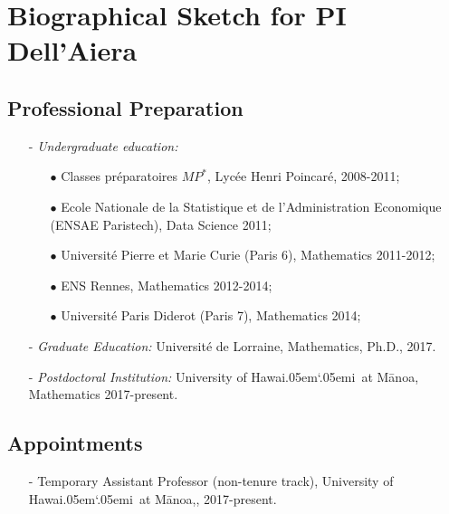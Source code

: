\documentclass[11pt]{article}
\newcommand{\Manoa}{M\=anoa}
\newcommand{\Hawaii}{Hawai\kern.05em`\kern.05em\relax i}
\begin{document}

\section*{Biographical Sketch for PI Dell'Aiera}

\subsection*{Professional Preparation}

\begin{itemize}

\item[-] \emph{Undergraduate education:} 
\begin{itemize}
\item[$\bullet$] Classes pr\'eparatoires $MP^*$, Lyc\'ee Henri Poincar\'e, 2008-2011; 
\item[$\bullet$] Ecole Nationale de la Statistique et de l'Administration Economique (ENSAE Paristech), Data Science 2011;
\item[$\bullet$] Universit\'e Pierre et Marie Curie (Paris 6), Mathematics 2011-2012; 
\item[$\bullet$] ENS Rennes, Mathematics 2012-2014; 
\item[$\bullet$] Universit\'e Paris Diderot (Paris 7), Mathematics 2014;
\end{itemize}

\item[-] \emph{Graduate Education:} Universit\'e de Lorraine, Mathematics, Ph.D., 2017.


\item[-] \emph{Postdoctoral Institution:} University of \Hawaii~at \Manoa, Mathematics 2017-present.

\end{itemize}

\vspace{.5cm}

\subsection*{Appointments}

\begin{itemize}

\item[-]  Temporary Assistant Professor (non-tenure track), University of \Hawaii~at \Manoa,, 2017-present.\\

\end{itemize}
\end{document}
